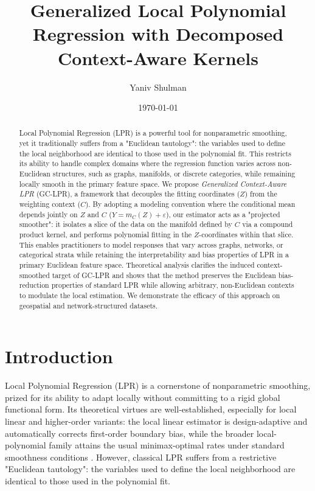 \documentclass[final,1p,times,authoryear]{elsarticle}
\begin{document}
\begin{frontmatter}

\title{Generalized Local Polynomial Regression with Decomposed Context-Aware Kernels}
\author{Yaniv Shulman}
\address{yaniv@shulman.info}
\date{\today}

\begin{abstract}
Local Polynomial Regression (LPR) is a powerful tool for nonparametric smoothing, yet it traditionally suffers from a "Euclidean tautology": the variables used to define the local neighborhood are identical to those used in the polynomial fit. This restricts its ability to handle complex domains where the regression function varies across non-Euclidean structures, such as graphs, manifolds, or discrete categories, while remaining locally smooth in the primary feature space. We propose \emph{Generalized Context-Aware LPR} (GC-LPR), a framework that decouples the fitting coordinates ($Z$) from the weighting context ($C$). By adopting a modeling convention where the conditional mean depends jointly on $Z$ and $C$ ($Y = m_C(Z) + \varepsilon$), our estimator acts as a "projected smoother": it isolates a slice of the data on the manifold defined by $C$ via a compound product kernel, and performs polynomial fitting in the $Z$-coordinates within that slice. This enables practitioners to model responses that vary across graphs, networks, or categorical strata while retaining the interpretability and bias properties of LPR in a primary Euclidean feature space. Theoretical analysis clarifies the induced context-smoothed target of GC-LPR and shows that the method preserves the Euclidean bias-reduction properties of standard LPR while allowing arbitrary, non-Euclidean contexts to modulate the local estimation. We demonstrate the efficacy of this approach on geospatial and network-structured datasets.
\end{abstract}
\end{frontmatter}

\section{Introduction}
\label{s:Introduction}

Local Polynomial Regression (LPR) is a cornerstone of nonparametric smoothing, prized for its ability to adapt locally without committing to a rigid global functional form. Its theoretical virtues are well-established, especially for local linear and higher-order variants: the local linear estimator is design-adaptive and automatically corrects first-order boundary bias, while the broader local-polynomial family attains the usual minimax-optimal rates under standard smoothness conditions \citep{fan1996local, loader1999local}. However, classical LPR suffers from a restrictive "Euclidean tautology": the variables used to define the local neighborhood are identical to those used in the polynomial fit.
\end{document}
